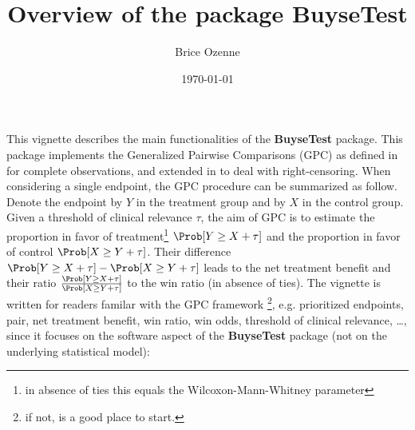 \documentclass[12pt]{article}
\author{Brice Ozenne}
\date{\today}
\title{Overview of the package BuyseTest}
\begin{document}
\maketitle
This vignette describes the main functionalities of the \textbf{BuyseTest}
package. This package implements the Generalized Pairwise Comparisons
(GPC) as defined in \cite{buyse2010generalized} for complete
observations, and extended in \cite{peron2018extension} to deal with
right-censoring. When considering a single endpoint, the GPC procedure
can be summarized as follow. Denote the endpoint by \(Y\) in the
treatment group and by \(X\) in the control group. Given a threshold
of clinical relevance \(\tau\), the aim of GPC is to estimate the
proportion in favor of treatment\footnote{in absence of ties this equals
the Wilcoxon-Mann-Whitney parameter} \(\Prob[Y \geq X + \tau]\) and
the proportion in favor of control \(\Prob[X \geq Y + \tau]\). Their
difference \(\Prob[Y \geq X + \tau]-\Prob[X \geq Y + \tau]\) leads to
the net treatment benefit and their ratio \(\frac{\Prob[Y \geq X +
\tau]}{\Prob[X \geq Y + \tau]}\) to the win ratio (in absence of
ties). The vignette is written for readers familar with the GPC
framework \footnote{if not, \cite{buyse2010generalized} is a good place to
start.}, e.g. prioritized endpoints, pair, net treatment benefit, win
ratio, win odds, threshold of clinical relevance, \ldots, since it focuses on
the software aspect of the \textbf{BuyseTest} package (not on the underlying
statistical model):
\end{document}
